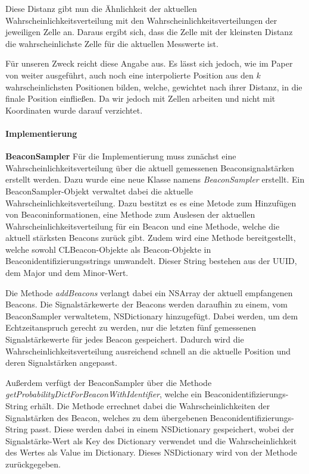 Diese Distanz gibt nun die Ähnlichkeit der aktuellen Wahrscheinlichkeitsverteilung mit den Wahrscheinlichkeitsverteilungen der jeweiligen Zelle an. Daraus ergibt sich, dass die Zelle mit der kleinsten Distanz die wahrscheinlichste Zelle für die aktuellen Messwerte ist.

Für unseren Zweck reicht diese Angabe aus. Es lässt sich jedoch, wie im Paper von \citet{wifiFingerprintProbability} weiter ausgeführt, auch noch eine interpolierte Position aus den $k$ wahrscheinlichsten Positionen bilden, welche, gewichtet nach ihrer Distanz, in die finale Position einfließen. Da wir jedoch mit Zellen arbeiten und nicht mit Koordinaten wurde darauf verzichtet. 

\paragraph{Implementierung}
\label{sec:implementation:fingerprinting:positioning:probability:implementiation}



\textbf{BeaconSampler}
Für die Implementierung muss zunächst eine Wahrscheinlichkeitsverteilung über die aktuell gemessenen Beaconsignalstärken erstellt werden. Dazu wurde eine neue Klasse namens \emph{BeaconSampler} erstellt. Ein BeaconSampler-Objekt verwaltet dabei die aktuelle Wahrscheinlichkeitsverteilung. Dazu bestitzt es es eine Metode zum Hinzufügen von Beaconinformationen, eine Methode zum Auslesen der aktuellen Wahrscheinlichkeitsverteilung für ein Beacon und eine Methode, welche die aktuell stärksten Beacons zurück gibt. Zudem wird eine Methode bereitgestellt, welche sowohl CLBeacon-Objekte als Beacon-Objekte in Beaconidentifizierungsstrings umwandelt. Dieser String bestehen aus der UUID, dem Major und dem Minor-Wert.

Die Methode \emph{addBeacons} verlangt dabei ein NSArray der aktuell empfangenen Beacons. Die Signalstärkewerte der Beacons werden daraufhin zu einem, vom BeaconSampler verwaltetem, NSDictionary hinzugefügt. Dabei werden, um dem Echtzeitanspruch gerecht zu werden, nur die letzten fünf gemessenen Signalstärkewerte für jedes Beacon gespeichert. Dadurch wird die Wahrscheinlichkeitsverteilung ausreichend schnell an die aktuelle Position und deren Signalstärken angepasst.

Außerdem verfügt der BeaconSampler über die Methode \emph{getProbabilityDictForBeaconWithIdentifier}, welche ein Beaconidentifizierungs-String erhält. Die Methode errechnet dabei die Wahrscheinlichkeiten der Signalstärken des Beacon, welches zu dem übergebenen Beaconidentifizierungs-String passt. Diese werden dabei in einem NSDictionary gespeichert, wobei der Signalstärke-Wert als Key des Dictionary verwendet und die Wahrscheinlichkeit des Wertes als Value im Dictionary. Dieses NSDictionary wird von der Methode zurückgegeben.

